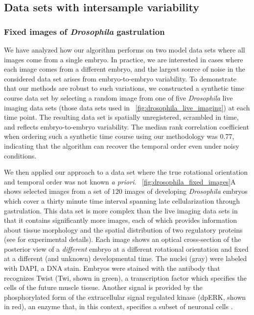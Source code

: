\subsection{Data sets with intersample variability}

\subsubsection{Fixed images of {\em Drosophila} gastrulation}


We have analyzed how our algorithm performs on two model data sets where all images come from a single embryo.
%
In practice, we are interested in cases where each image comes from a different embryo, and the largest source of noise in the considered data set arises from embryo-to-embryo variability.
%
To demonstrate that our methods are robust to such variations,
we constructed a synthetic time course data set by selecting a random image from one of five {\em Drosophila} live imaging data sets (those data sets used in \fig~\ref{fig:drosophila_live_imaging}) at each time point.
%
The resulting data set is spatially unregistered, scrambled in time, and reflects embryo-to-embryo variability.
%
The median rank correlation coefficient when ordering such a synthetic time course using our methodology was 0.77, indicating that the algorithm can recover the temporal order even under noisy conditions.

We then applied our approach to a data set where the true rotational orientation and temporal order was not known {\it a priori}.
%
\fig~\ref{fig:drosophila_fixed_images}A shows selected images from a set of $120$ images of developing {\em Drosophila} embryos which cover a thirty minute time interval spanning late cellularization through gastrulation.
%
This data set is more complex than the live imaging data sets in that it contains significantly more images, each of which provides information about tissue morphology and the spatial distribution of two regulatory proteins  (see \cite{dsilva2015temporal} for experimental details).
%
Each image shows an optical cross-section of the posterior view of a {\em different} embryo at a different rotational orientation and fixed at a different (and unknown) developmental time.
%
The nuclei (gray) were labeled with DAPI, a DNA stain.
%
Embryos were stained with the antibody that recognizes Twist (Twi, shown in green), a transcription factor which specifies the cells of the future muscle tissue.
%
Another signal is provided by the phosphorylated form of the extracellular signal regulated kinase (dpERK, shown in red), an enzyme that, in this context, specifies a subset of neuronal cells \citep{Lim2013kinetics}.

